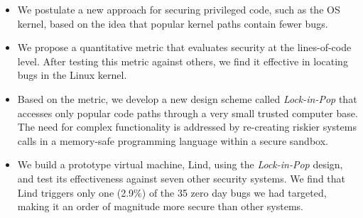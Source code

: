 \begin{itemize}\setlength\itemsep{0em}
\item
We postulate a new approach for securing privileged code,
such as the OS kernel, based on the idea that popular kernel paths contain fewer bugs.

\item
We propose a quantitative metric that evaluates security
 at the lines-of-code level.
After testing this metric against others, we find it effective in locating
 bugs in the Linux kernel.

\item
Based on the metric, we develop a new design scheme called \emph{Lock-in-Pop} that
accesses only popular code paths
through a very small trusted computer base.
The need for complex functionality is addressed by re-creating riskier systems calls
in a memory-safe programming language within a secure sandbox.

\item
We build a prototype virtual machine, Lind, using the \emph{Lock-in-Pop} design,
 and test its effectiveness against seven other security systems. We find that
 Lind triggers only one
(2.9\%) of the 35 zero day bugs we had targeted,
making it an order of magnitude more secure than other systems.
\end{itemize}

%
